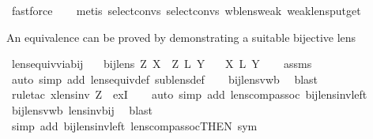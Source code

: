 \begin{isabellebody}
\ fastforce\isanewline
\ \ \isamarkupfalse%
\ {\isacharparenleft}metis\ select{\isacharunderscore}convs{\isacharparenleft}{}{\isacharparenright}\ select{\isacharunderscore}convs{\isacharparenleft}{}{\isacharparenright}\ wb{\isacharunderscore}lens{\isacharunderscore}weak\ weak{\isacharunderscore}lens{\isachardot}put{\isacharunderscore}get{\isacharparenright}\isanewline
{}\isamarkupfalse%
%
\endisatagproof
{\isafoldproof}%
%
\isadelimproof
%
\endisadelimproof
%
\begin{isamarkuptext}%
An equivalence can be proved by demonstrating a suitable bijective lens%
\end{isamarkuptext}\isamarkuptrue%
\isamarkupfalse%
\ lens{\isacharunderscore}equiv{\isacharunderscore}via{\isacharunderscore}bij{\isacharcolon}\isanewline
\ \ \ {\isachardoublequoteopen}bij{\isacharunderscore}lens\ Z{\isachardoublequoteclose}\ {\isachardoublequoteopen}X\ {\isacharequal}\ Z\ {\isacharsemicolon}\isactrlsub L\ Y{\isachardoublequoteclose}\isanewline
\ \ \ {\isachardoublequoteopen}X\ {\isasymapprox}\isactrlsub L\ Y{\isachardoublequoteclose}\isanewline
%
\isadelimproof
\ \ %
\endisadelimproof
%
\isatagproof
{}\isamarkupfalse%
\ assms\isanewline
\ \ \isamarkupfalse%
\ {\isacharparenleft}auto\ simp\ add{\isacharcolon}\ lens{\isacharunderscore}equiv{\isacharunderscore}def\ sublens{\isacharunderscore}def{\isacharparenright}\isanewline
\ \ \isamarkupfalse%
\ bij{\isacharunderscore}lens{\isacharunderscore}vwb\ \isamarkupfalse%
\ blast\isanewline
\ \ \isamarkupfalse%
\ {\isacharparenleft}rule{\isacharunderscore}tac\ x{\isacharequal}{\isachardoublequoteopen}lens{\isacharunderscore}inv\ Z{\isachardoublequoteclose}\ \ exI{\isacharparenright}\isanewline
\ \ \isamarkupfalse%
\ {\isacharparenleft}auto\ simp\ add{\isacharcolon}\ lens{\isacharunderscore}comp{\isacharunderscore}assoc\ bij{\isacharunderscore}lens{\isacharunderscore}inv{\isacharunderscore}left{\isacharparenright}\isanewline
\ \ \isamarkupfalse%
\ bij{\isacharunderscore}lens{\isacharunderscore}vwb\ lens{\isacharunderscore}inv{\isacharunderscore}bij\ \isamarkupfalse%
\ blast\isanewline
\ \ \isamarkupfalse%
\ {\isacharparenleft}simp\ add{\isacharcolon}\ bij{\isacharunderscore}lens{\isacharunderscore}inv{\isacharunderscore}left\ lens{\isacharunderscore}comp{\isacharunderscore}assoc{\isacharbrackleft}THEN\ sym{\isacharbrackright}{\isacharparenright}\isanewline

\end{isabellebody}
